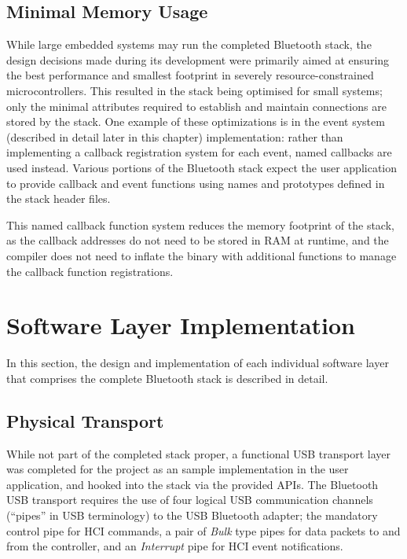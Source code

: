 \FloatBarrier
\subsection{Minimal Memory Usage}

While large embedded systems may run the completed Bluetooth stack, the design decisions made during its development were primarily aimed at ensuring the best performance and smallest footprint in severely resource-constrained microcontrollers. This resulted in the stack being optimised for small systems; only the minimal attributes required to establish and maintain connections are stored by the stack. One example of these optimizations is in the event system (described in detail later in this chapter) implementation: rather than implementing a callback registration system for each event, named callbacks are used instead. Various portions of the Bluetooth stack expect the user application to provide callback and event functions using names and prototypes defined in the stack header files.

This named callback function system reduces the memory footprint of the stack, as the callback addresses do not need to be stored in RAM at runtime, and the compiler does not need to inflate the binary with additional functions to manage the callback function registrations.

\section{Software Layer Implementation}

In this section, the design and implementation of each individual software layer that comprises the complete Bluetooth stack is described in detail.

\FloatBarrier
\subsection{Physical Transport}

While not part of the completed stack proper, a functional USB transport layer was completed for the project as an sample implementation in the user application, and hooked into the stack via the provided APIs. The Bluetooth USB transport requires the use of four logical USB communication channels (``pipes'' in USB terminology) to the USB Bluetooth adapter; the mandatory control pipe for HCI commands, a pair of \textit{Bulk} type pipes for data packets to and from the controller, and an \textit{Interrupt} pipe for HCI event notifications.


